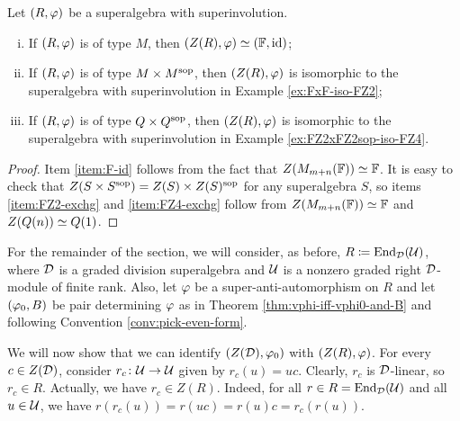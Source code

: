 
\begin{prop}\label{prop:types-of-SA-via-center}
    Let $(R, \varphi)$ be a superalgebra with superinvolution.
    \begin{enumerate}[(i)]
        \item If $(R, \varphi)$ is of type $M$, then $(Z(R), \varphi) \simeq (\mathbb{F}, \operatorname{id})$;\label{item:F-id}
        \item If $(R, \varphi)$ is of type $M\times M^{\mathrm{sop}}$, then $(Z(R), \varphi)$ is isomorphic to the superalgebra with superinvolution in Example \ref{ex:FxF-iso-FZ2};\label{item:FZ2-exchg}
        \item If $(R, \varphi)$ is of type $Q\times Q^{\mathrm{sop}}$, then $(Z(R), \varphi)$ is isomorphic to the superalgebra with superinvolution in Example \ref{ex:FZ2xFZ2sop-iso-FZ4}.\label{item:FZ4-exchg}
    \end{enumerate}
\end{prop}

\begin{proof}
    Item \eqref{item:F-id} follows from the fact that $Z(M_{m+n}(\mathbb{F})) \simeq \mathbb{F}$. 
    It is easy to check that $Z(S\times S^{\mathrm{sop}}) = Z(S) \times Z(S)^{\mathrm{sop}}$ for any superalgebra $S$, so items \eqref{item:FZ2-exchg} and \eqref{item:FZ4-exchg} follow from $Z(M_{m+n}(\mathbb{F})) \simeq \mathbb{F}$ and $Z(Q(n)) \simeq Q(1)$.
\end{proof}

For the remainder of the section, we will consider, as before, $R \coloneqq \operatorname{End}_{\mathcal{D}}(\mathcal U)$, where $\mathcal{D}$ is a graded division superalgebra and $\mathcal U$ is a nonzero graded right $\mathcal{D}$-module of finite rank. 
Also, let $\varphi$ be a super-anti-automorphism on $R$ and let $(\varphi_0, B)$ be pair determining $\varphi$ as in Theorem \ref{thm:vphi-iff-vphi0-and-B} and following Convention \ref{conv:pick-even-form}.

We will now show that we can identify $(Z(\mathcal{D}), \varphi_0)$ with $(Z(R), \varphi)$. 
For every $c\in Z(\mathcal{D})$, consider $r_c\colon \mathcal U \to \mathcal U$ given by $r_c(u) = uc$. 
Clearly, $r_c$ is $\mathcal{D}$-linear, so $r_c \in R$. 
Actually, we have $r_c\in Z(R)$. 
Indeed, for all $r\in R = \operatorname{End}_{\mathcal{D}}(\mathcal U)$ and all $u\in \mathcal U$, we have $r (r_c(u)) = r(uc) = r(u) c = r_c(r(u))$.

